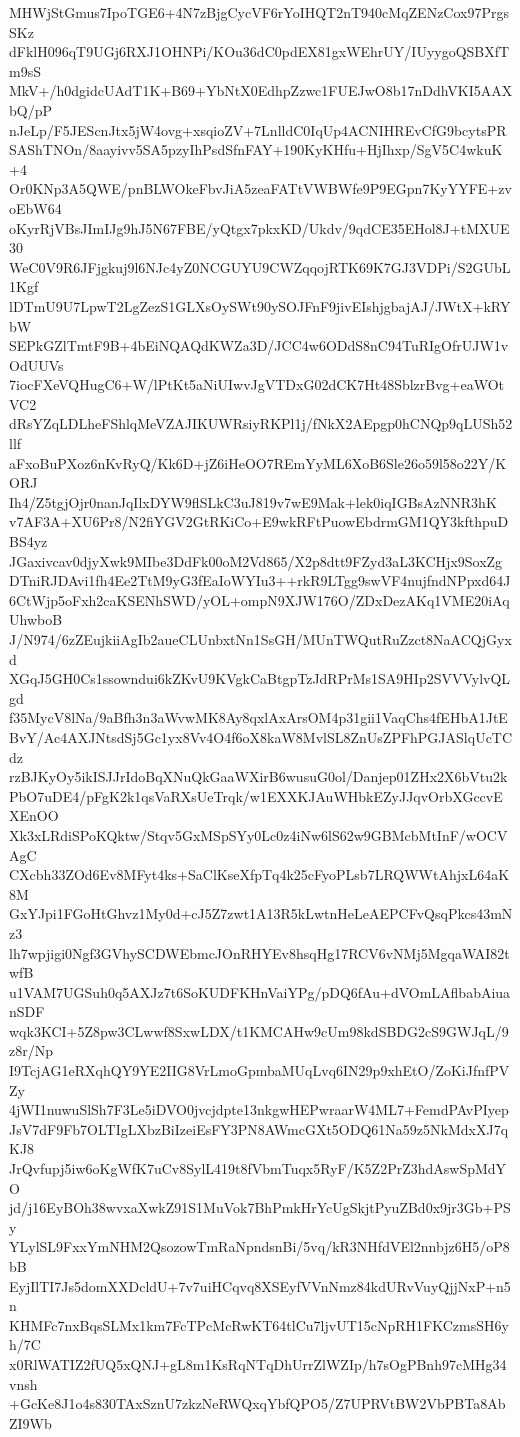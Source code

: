 MHWjStGmus7IpoTGE6+4N7zBjgCycVF6rYoIHQT2nT940cMqZENzCox97PrgsSKz
dFklH096qT9UGj6RXJ1OHNPi/KOu36dC0pdEX81gxWEhrUY/IUyygoQSBXfTm9sS
MkV+/h0dgidcUAdT1K+B69+YbNtX0EdhpZzwc1FUEJwO8b17nDdhVKI5AAXbQ/pP
nJeLp/F5JEScnJtx5jW4ovg+xsqioZV+7LnlldC0IqUp4ACNIHREvCfG9bcytsPR
SAShTNOn/8aayivv5SA5pzyIhPsdSfnFAY+190KyKHfu+HjIhxp/SgV5C4wkuK+4
Or0KNp3A5QWE/pnBLWOkeFbvJiA5zeaFATtVWBWfe9P9EGpn7KyYYFE+zvoEbW64
oKyrRjVBsJImIJg9hJ5N67FBE/yQtgx7pkxKD/Ukdv/9qdCE35EHol8J+tMXUE30
WeC0V9R6JFjgkuj9l6NJc4yZ0NCGUYU9CWZqqojRTK69K7GJ3VDPi/S2GUbL1Kgf
lDTmU9U7LpwT2LgZezS1GLXsOySWt90ySOJFnF9jivEIshjgbajAJ/JWtX+kRYbW
SEPkGZlTmtF9B+4bEiNQAQdKWZa3D/JCC4w6ODdS8nC94TuRIgOfrUJW1vOdUUVs
7iocFXeVQHugC6+W/lPtKt5aNiUIwvJgVTDxG02dCK7Ht48SblzrBvg+eaWOtVC2
dRsYZqLDLheFShlqMeVZAJIKUWRsiyRKPl1j/fNkX2AEpgp0hCNQp9qLUSh52llf
aFxoBuPXoz6nKvRyQ/Kk6D+jZ6iHeOO7REmYyML6XoB6Sle26o59l58o22Y/KORJ
Ih4/Z5tgjOjr0nanJqIlxDYW9flSLkC3uJ819v7wE9Mak+lek0iqIGBsAzNNR3hK
v7AF3A+XU6Pr8/N2fiYGV2GtRKiCo+E9wkRFtPuowEbdrmGM1QY3kfthpuDBS4yz
JGaxivcav0djyXwk9MIbe3DdFk00oM2Vd865/X2p8dtt9FZyd3aL3KCHjx9SoxZg
DTniRJDAvi1fh4Ee2TtM9yG3fEaIoWYIu3++rkR9LTgg9swVF4nujfndNPpxd64J
6CtWjp5oFxh2caKSENhSWD/yOL+ompN9XJW176O/ZDxDezAKq1VME20iAqUhwboB
J/N974/6zZEujkiiAgIb2aueCLUnbxtNn1SsGH/MUnTWQutRuZzct8NaACQjGyxd
XGqJ5GH0Cs1ssowndui6kZKvU9KVgkCaBtgpTzJdRPrMs1SA9HIp2SVVVylvQLgd
f35MycV8lNa/9aBfh3n3aWvwMK8Ay8qxlAxArsOM4p31gii1VaqChs4fEHbA1JtE
BvY/Ac4AXJNtsdSj5Gc1yx8Vv4O4f6oX8kaW8MvlSL8ZnUsZPFhPGJASlqUcTCdz
rzBJKyOy5ikISJJrIdoBqXNuQkGaaWXirB6wusuG0ol/Danjep01ZHx2X6bVtu2k
PbO7uDE4/pFgK2k1qsVaRXsUeTrqk/w1EXXKJAuWHbkEZyJJqvOrbXGccvEXEnOO
Xk3xLRdiSPoKQktw/Stqv5GxMSpSYy0Lc0z4iNw6lS62w9GBMcbMtInF/wOCVAgC
CXcbh33ZOd6Ev8MFyt4ks+SaClKseXfpTq4k25cFyoPLsb7LRQWWtAhjxL64aK8M
GxYJpi1FGoHtGhvz1My0d+cJ5Z7zwt1A13R5kLwtnHeLeAEPCFvQsqPkcs43mNz3
lh7wpjigi0Ngf3GVhySCDWEbmcJOnRHYEv8hsqHg17RCV6vNMj5MgqaWAI82twfB
u1VAM7UGSuh0q5AXJz7t6SoKUDFKHnVaiYPg/pDQ6fAu+dVOmLAflbabAiuanSDF
wqk3KCI+5Z8pw3CLwwf8SxwLDX/t1KMCAHw9cUm98kdSBDG2cS9GWJqL/9z8r/Np
I9TcjAG1eRXqhQY9YE2IIG8VrLmoGpmbaMUqLvq6IN29p9xhEtO/ZoKiJfnfPVZy
4jWI1nuwuSlSh7F3Le5iDVO0jvcjdpte13nkgwHEPwraarW4ML7+FemdPAvPIyep
JsV7dF9Fb7OLTIgLXbzBiIzeiEsFY3PN8AWmcGXt5ODQ61Na59z5NkMdxXJ7qKJ8
JrQvfupj5iw6oKgWfK7uCv8SylL419t8fVbmTuqx5RyF/K5Z2PrZ3hdAswSpMdYO
jd/j16EyBOh38wvxaXwkZ91S1MuVok7BhPmkHrYcUgSkjtPyuZBd0x9jr3Gb+PSy
YLylSL9FxxYmNHM2QsozowTmRaNpndsnBi/5vq/kR3NHfdVEl2nnbjz6H5/oP8bB
EyjIlTI7Js5domXXDcldU+7v7uiHCqvq8XSEyfVVnNmz84kdURvVuyQjjNxP+n5n
KHMFc7nxBqsSLMx1km7FcTPcMcRwKT64tlCu7ljvUT15cNpRH1FKCzmsSH6yh/7C
x0RlWATIZ2fUQ5xQNJ+gL8m1KsRqNTqDhUrrZlWZIp/h7sOgPBnh97cMHg34vnsh
+GcKe8J1o4s830TAxSznU7zkzNeRWQxqYbfQPO5/Z7UPRVtBW2VbPBTa8AbZI9Wb
